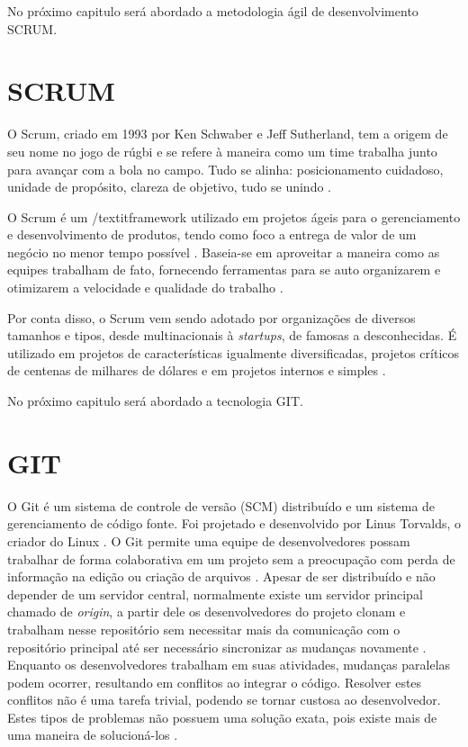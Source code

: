 No próximo capitulo será abordado a metodologia ágil de desenvolvimento SCRUM.
\section{SCRUM}
O Scrum, criado em 1993 por Ken Schwaber e Jeff Sutherland, tem a origem de seu nome no jogo de rúgbi e se refere à maneira como um time trabalha junto para avançar com a bola no campo. Tudo se alinha: posicionamento cuidadoso, unidade de propósito, clareza de objetivo, tudo se unindo \cite{rocha2015metodologia}.

O Scrum é um /textit{framework} utilizado em projetos ágeis para o gerenciamento e desenvolvimento de produtos, tendo como foco a entrega de valor de um negócio no menor tempo possível \cite{cruz2013scrum}. Baseia-se em aproveitar a maneira como as equipes trabalham de fato, fornecendo ferramentas para se auto organizarem e otimizarem a velocidade e qualidade do trabalho \cite{sutherland2016scrum}.

Por conta disso, o Scrum vem sendo adotado por organizações de diversos tamanhos e tipos, desde multinacionais à \textit{startups}, de famosas a desconhecidas. É utilizado em projetos de características igualmente diversificadas, projetos críticos de centenas de milhares de dólares e em projetos internos e simples \cite{sabbagh2014scrum}.

No próximo capitulo será abordado a tecnologia GIT.
\section{GIT}
O Git é um sistema de controle de versão (SCM) distribuído e um sistema de gerenciamento de código fonte. Foi projetado e desenvolvido por Linus Torvalds, o criador do Linux \cite{souzagerenciamento}.
O Git permite uma equipe de desenvolvedores possam trabalhar de forma colaborativa em um projeto sem a preocupação com perda de informação na edição ou criação de arquivos \cite{konnorate2019importancia}.
Apesar de ser distribuído e não depender de um servidor central, normalmente existe um servidor principal chamado de \textit{origin}, a partir dele os desenvolvedores do projeto clonam e trabalham nesse repositório sem necessitar mais da comunicação com o repositório principal até ser necessário sincronizar as mudanças novamente \cite{cunha2018entendendo}.
Enquanto os desenvolvedores trabalham em suas atividades, mudanças paralelas podem ocorrer, resultando em conflitos ao integrar o código. Resolver estes conflitos não é uma tarefa trivial, podendo se tornar custosa ao desenvolvedor. Estes tipos de problemas não possuem uma solução exata, pois existe mais de uma maneira de solucioná-los \cite{cunha2018entendendo}.

